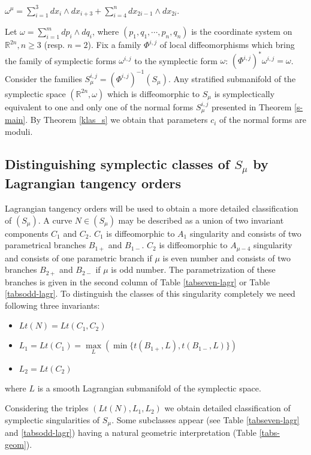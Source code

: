 \documentclass{amsart}
\theoremstyle{definition}
\numberwithin{equation}{section}
\begin{document}
\smallskip

\noindent $\omega ^{\mu} = \sum_{i=1}^3 dx_i \wedge dx_{i+3}+ \sum_{i=4}^n dx_{2i-1} \wedge dx_{2i}.$

\medskip

 Let $\omega = \sum_{i=1}^m dp_i \wedge dq_i$, where
$(p_1,q_1,\cdots,p_n,q_n)$ is the coordinate system on $\mathbb
R^{2n}, n\ge 3$ (resp. $n=2$). Fix a family $\Phi ^{i,j}$ of local diffeomorphisms which bring the family of symplectic forms $\omega ^{i,j}$ to the symplectic form $\omega $: $(\Phi ^{i,j})^*\omega ^{i,j} = \omega $. Consider the families $S_{\mu}^{i,j} = (\Phi ^{i,j})^{-1}(S_{\mu})$. Any stratified submanifold of the symplectic space $(\mathbb R^{2n},
\omega )$ which is diffeomorphic to $S_{\mu}$ is symplectically
equivalent to one and only one of the normal forms $S_{\mu}^{i,j}$ presented in Theorem
\ref{s-main}. By Theorem \ref{klas_s} we obtain that  parameters
$c_i$ of the normal forms are moduli.

\subsection{Distinguishing symplectic classes of $S_{\mu}$ by Lagrangian tangency orders}
\label{s-lagr}

Lagrangian tangency orders will be used to obtain a more detailed
classification of $(S_{\mu})$. A curve $N\in (S_{\mu})$ may be described
as a union of two invariant components $C_1$ and $C_2$. $C_1$ is diffeomorphic to $A_1$ singularity and consists of two parametrical branches $B_{1+}$ and $B_{1-}$. $C_2$ is diffeomorphic to $A_{\mu-4}$ singularity and consists of one parametric branch if $\mu$ is even number and consists of two branches $B_{2+}$ and $B_{2-}$ if $\mu$ is odd number. The parametrization of these branches is given in the second column of Table
\ref{tabseven-lagr} or Table
\ref{tabsodd-lagr}. To distinguish the classes of this singularity completely we need following three invariants:
\begin{itemize}
  \item $Lt(N)=Lt(C_1,C_2)
      $
  \item $L_1=Lt(C_1)=\max\limits _L (\min \{t(B_{1+},L), t(B_{1-},L)\})$
  \item $L_2=Lt(C_2)
  $
\end{itemize}

where $L$ is a smooth Lagrangian submanifold of the symplectic
space.

\medskip

 Considering the triples $(Lt(N), L_1, L_2)$ we obtain detailed classification of
symplectic singularities of $S_{\mu}$. Some subclasses appear (see Table
\ref{tabseven-lagr} and \ref{tabsodd-lagr}) having a natural geometric interpretation
(Table \ref{tabs-geom}).
\end{document}
